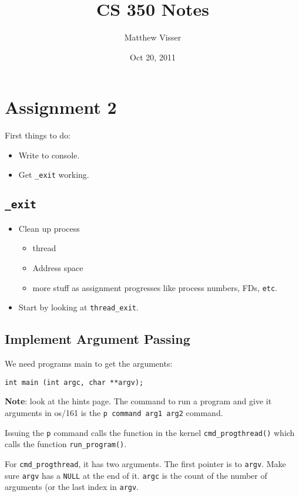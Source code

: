 \documentclass[12pt]{article}
\begin{document}
\title{CS 350 Notes}
\author{Matthew Visser}
\date{Oct 20, 2011}
\maketitle

\section{Assignment 2}

First things to do:
\begin{itemize}
	\item Write to console.
	\item Get \texttt{\_exit} working.
\end{itemize}

\subsection{\texttt{\_exit}}

\begin{itemize}
	\item Clean up process
		\begin{itemize}
			\item thread
			\item Address space
			\item more stuff as assignment progresses like process numbers, FDs,
				\texttt{etc}.
		\end{itemize}
	\item Start by looking at \texttt{thread\_exit}.
\end{itemize}

\subsection{Implement Argument Passing}

We need programs main to get the arguments:
\begin{verbatim}
int main (int argc, char **argv);
\end{verbatim}

\textbf{Note}: look at the hints page. The command to run a program and give it
arguments in os/161 is the \texttt{p command arg1 arg2} command.

Issuing the \texttt{p} command calls the function in the kernel
\texttt{cmd\_progthread()} which calls the function
\texttt{run\_program()}.

For \texttt{cmd\_progthread}, it has two arguments. The first pointer is to
\texttt{argv}. Make sure \texttt{argv} has a \texttt{NULL} at the end of it.
\texttt{argc} is the count of the number of arguments (or the last index in
\texttt{argv}.
\end{document}
